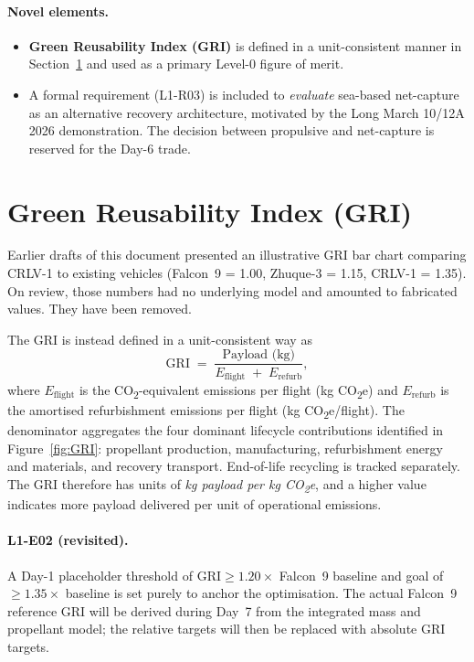 \documentclass[10pt,a4paper]{article}
\begin{document}
\paragraph{Novel elements.}
\begin{itemize}[leftmargin=*]
    \item \textbf{Green Reusability Index (GRI)} is defined in a unit-consistent manner in Section~\ref{sec:GRI} and used as a primary Level-0 figure of merit.
    \item A formal requirement (L1-R03) is included to \emph{evaluate} sea-based net-capture as an alternative recovery architecture, motivated by the Long March 10/12A 2026 demonstration. The decision between propulsive and net-capture is reserved for the Day-6 trade.
\end{itemize}

\section{Green Reusability Index (GRI)}
\label{sec:GRI}
Earlier drafts of this document presented an illustrative GRI bar chart comparing CRLV-1 to existing vehicles (Falcon~9 = 1.00, Zhuque-3 = 1.15, CRLV-1 = 1.35). On review, those numbers had no underlying model and amounted to fabricated values. They have been removed.

The GRI is instead defined in a unit-consistent way as
\begin{equation}
\mathrm{GRI} \;=\; \frac{\text{Payload (kg)}}{E_{\mathrm{flight}} \;+\; E_{\mathrm{refurb}}},
\label{eq:GRI}
\end{equation}
where $E_{\mathrm{flight}}$ is the CO\textsubscript{2}-equivalent emissions per flight (kg CO\textsubscript{2}e) and $E_{\mathrm{refurb}}$ is the amortised refurbishment emissions per flight (kg CO\textsubscript{2}e/flight). The denominator aggregates the four dominant lifecycle contributions identified in Figure~\ref{fig:GRI}: propellant production, manufacturing, refurbishment energy and materials, and recovery transport. End-of-life recycling is tracked separately. The GRI therefore has units of \emph{kg payload per kg CO\textsubscript{2}e}, and a higher value indicates more payload delivered per unit of operational emissions.

\paragraph{L1-E02 (revisited).} A Day-1 placeholder threshold of $\mathrm{GRI} \geq 1.20 \times$ Falcon~9 baseline and goal of $\geq 1.35 \times$ baseline is set purely to anchor the optimisation. The actual Falcon~9 reference GRI will be derived during Day~7 from the integrated mass and propellant model; the relative targets will then be replaced with absolute GRI targets.
\end{document}
